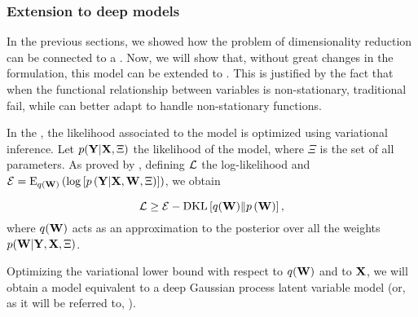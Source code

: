 \subsubsection{Extension to deep models}

In the previous sections, we showed how the problem of dimensionality reduction can be connected to a \gplvm. Now, we will show that, without great changes in the formulation, this model can be extended to \dgplvm. This is justified by the fact that when the functional relationship between variables is non-stationary, traditional  fail, while \dgp can better adapt to handle non-stationary functions.

In the \dgplvm, the likelihood associated to the model is optimized using variational inference. Let $p(\mathbf{Y}\vert\mathbf{X},\Xi)$ the likelihood of the model, where $\Xi$ is the set of all parameters. As proved by \citet{Filippone2017}, defining $\mathcal{L}$ the log-likelihood and $\mathcal{E} = \mathrm{E}_{q(\mathbf{W})} \left( \log\left[ p\left(\mathbf{Y} | \mathbf{X}, \mathbf{W}, \Xi\right) \right] \right)$, we obtain

\begin{equation}
\mathcal{L} \geq \mathcal{E} - \mathrm{DKL}\left[q(\mathbf{W}) \| p\left(\mathbf{W}\right)\right] \text{,}
\end{equation}
where $q(\mathbf{W})$ acts as an approximation to the posterior over all the weights $p(\mathbf{W} | \mathbf{Y}, \mathbf{X}, \Xi)$.

Optimizing the variational lower bound with respect to $q(\mathbf{W})$ and to $\mathbf{X}$, we will obtain a model equivalent to a deep Gaussian process latent variable model (or, as it will be referred to, \dgplvm).
